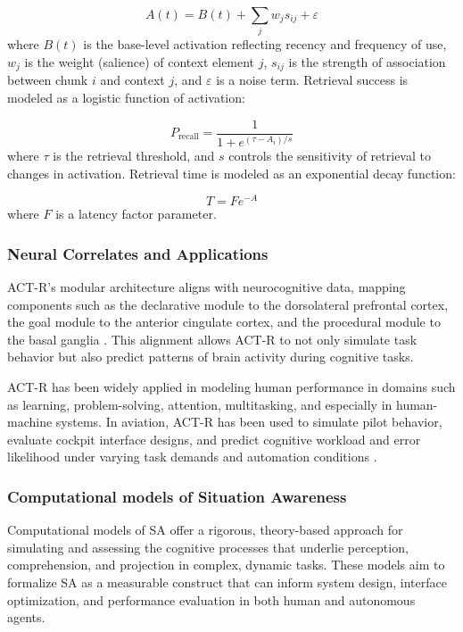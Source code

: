 \documentclass[12pt,a4paper]{article} %
\begin{document}
	\begin{equation}
	A(t) = B(t) + \sum_j w_j s_{ij} + \varepsilon
	\end{equation}
	where $B(t)$ is the base-level activation reflecting recency and frequency of use, $w_j$ is the weight (salience) of context element $j$, $s_{ij}$ is the strength of association between chunk $i$ and context $j$, and $\varepsilon$ is a noise term. Retrieval success is modeled as a logistic function of activation:

	\begin{equation}
	P_{\text{recall}} = \frac{1}{1 + e^{(\tau - A_i)/s}}
	\end{equation}
	where $\tau$ is the retrieval threshold, and $s$ controls the sensitivity of retrieval to changes in activation. Retrieval time is modeled as an exponential decay function:

	\begin{equation}
	T = F e^{-A}
	\end{equation}
	where $F$ is a latency factor parameter.

	\subsubsection*{Neural Correlates and Applications}
	ACT-R’s modular architecture aligns with neurocognitive data, mapping components such as the declarative module to the dorsolateral prefrontal cortex, the goal module to the anterior cingulate cortex, and the procedural module to the basal ganglia \parencite{anderson_how_2007}. This alignment allows ACT-R to not only simulate task behavior but also predict patterns of brain activity during cognitive tasks.

	ACT-R has been widely applied in modeling human performance in domains such as learning, problem-solving, attention, multitasking, and especially in human-machine systems. In aviation, ACT-R has been used to simulate pilot behavior, evaluate cockpit interface designs, and predict cognitive workload and error likelihood under varying task demands and automation conditions \parencite{klaproth_modeling_2024,xu_modeling_2021,foyle_human_2005}.

	\subsubsection{Computational models of Situation Awareness}

	Computational models of SA offer a rigorous, theory-based approach for simulating and assessing the cognitive processes that underlie perception, comprehension, and projection in complex, dynamic tasks. These models aim to formalize SA as a measurable construct that can inform system design, interface optimization, and performance evaluation in both human and autonomous agents.
\end{document}
